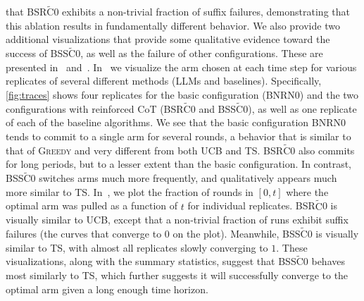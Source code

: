 \documentclass[11pt]{article}
\newcommand{\ucb}{\textsc{UCB}\xspace}
\newcommand{\ts}{\textsc{TS}\xspace}
\newcommand{\greedy}{\textsc{Greedy}\xspace}
\newcommand{\tC}{\widetilde{\text{C}}}
\begin{document}
that BSR$\tC$0 exhibits a non-trivial fraction of
suffix failures, demonstrating that this ablation results in
fundamentally different behavior.
We also provide two additional visualizations that provide some
qualitative evidence toward the success of BSS$\tC$0,
as well as the failure of other configurations. These are presented
in~ and~.  In~ we
visualize the arm chosen at each time step for various replicates of
several different methods (LLMs and baselines). Specifically, \cref{fig:traces} shows
four replicates for the basic configuration (BNRN0) and the
two configurations with reinforced CoT (BSR$\tC$0 and
BSS$\tC$0), as well as one replicate of each of the
baseline algorithms. We see that the basic configuration BNRN0 tends to commit to a
single arm for several rounds, a behavior that is similar to that of
\greedy and very different from both \ucb and \ts.
BSR$\tC$0 also commits for long periods, but to a lesser extent than
the basic configuration.  In contrast, BSS$\tC$0
switches arms much more frequently, and qualitatively appears much more
similar to \ts.
In~, we plot the fraction of rounds in $[0,t]$ where
the optimal arm was pulled as a function of $t$ for individual
replicates.  BSR$\tC$0 is visually similar to
\ucb, except that a non-trivial fraction of runs exhibit suffix failures (the curves that converge to
$0$ on the plot). Meanwhile, BSS$\tC$0 is visually
similar to \ts, with almost all replicates slowly converging to $1$.
These visualizations, along with the summary statistics,
suggest that BSS$\tC$0 behaves most similarly to
\ts, which further suggests it will successfully converge to the
optimal arm given a long enough time horizon.
\end{document}
